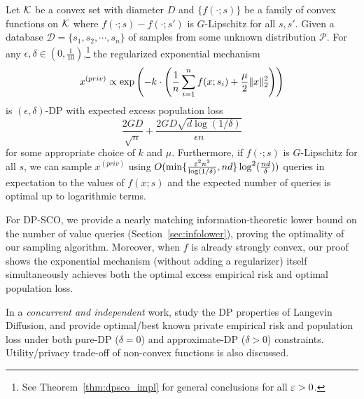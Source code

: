 \begin{theorem}
Let $\mathcal K$ be a convex set with diameter $D$ and $\{f(\cdot;s)\}$
be a family of convex functions on $\mathcal K$ where $f(\cdot;s)-f(\cdot;s')$ is $G$-Lipschitz for all $s,s'$. 
Given a
database $\mathcal{D}=\{s_{1},s_{2},\cdots,s_{n}\}$ of samples from
some unknown distribution $\mathcal{P}$. For any $\epsilon,\delta\in(0,\frac{1}{10})$,\footnote{
See Theorem~\ref{thm:dpsco_impl} for general conclusions for all $\varepsilon>0$.
}
the regularized exponential mechanism 
\[
x^{(priv)}\propto\exp\left(-k\cdot\left(\frac{1}{n}\sum_{i=1}^{n}f(x;s_{i})+\frac{\mu}{2}\|x\|_{2}^{2}\right)\right)
\]
is $(\epsilon,\delta)$-DP with expected excess population loss
\[
\frac{2GD}{\sqrt{n}}+\frac{2GD\sqrt{d\log(1/\delta)}}{\epsilon n}
\]
for some appropriate choice of $k$ and $\mu$. Furthermore, if $f(\cdot;s)$ is $G$-Lipschitz for all $s$, 
we can sample $x^{(priv)}$ using $O(\min\{\frac{\varepsilon^2n^2}{\log(1/\delta)},nd\}\log^2(\frac{nd}{\delta}))$ queries in expectation to the
values of $f(x;s)$ and the expected number of queries is optimal up to logarithmic terms. 
\end{theorem}

For DP-SCO, we provide a nearly matching information-theoretic lower bound on the number of value queries (Section~\ref{sec:infolower}), proving the optimality of our sampling algorithm.
Moreover, when $f$ is already strongly convex, our proof shows the exponential mechanism (without adding a regularizer) itself simultaneously achieves both the optimal excess empirical risk and optimal population loss. 

In a {\em concurrent and independent} work, \cite{GTU22} study the DP properties of Langevin Diffusion, and provide optimal/best known private empirical risk and population loss under both pure-DP ($\delta=0$) and approximate-DP ($\delta>0$) constraints.
Utility/privacy trade-off of non-convex functions is also discussed.





